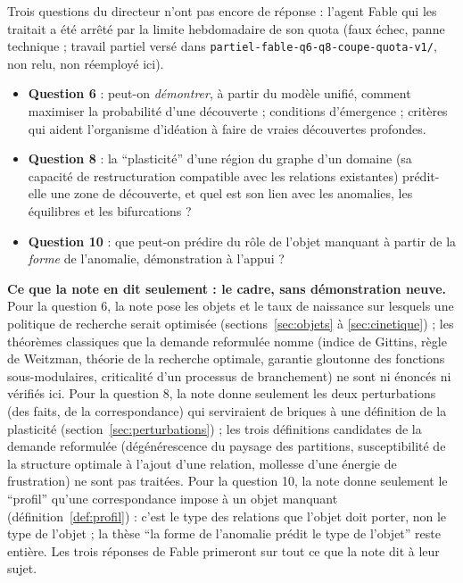 \documentclass[11pt,a4paper]{article}
\theoremstyle{definition}
\theoremstyle{plain}
\newcommand{\chemin}[1]{\nolinkurl{#1}}
\begin{document}
\begin{attente}
Trois questions du directeur n'ont pas encore de réponse : l'agent Fable qui les traitait a été
arrêté par la limite hebdomadaire de son quota (faux échec, panne technique ; travail partiel
versé dans \chemin{partiel-fable-q6-q8-coupe-quota-v1/}, non relu, non réemployé ici).
\begin{itemize}
\item \textbf{Question 6} : peut-on \emph{démontrer}, à partir du modèle unifié, comment maximiser la
probabilité d'une découverte ; conditions d'émergence ; critères qui aident l'organisme
d'idéation à faire de vraies découvertes profondes.
\item \textbf{Question 8} : la \enquote{plasticité} d'une région du graphe d'un domaine (sa capacité de
restructuration compatible avec les relations existantes) prédit-elle une zone de découverte,
et quel est son lien avec les anomalies, les équilibres et les bifurcations ?
\item \textbf{Question 10} : que peut-on prédire du rôle de l'objet manquant à partir de la
\emph{forme} de l'anomalie, démonstration à l'appui ?
\end{itemize}
\textbf{Ce que la note en dit seulement : le cadre, sans démonstration neuve.}
Pour la question 6, la note pose les objets et le taux de naissance sur lesquels une politique de
recherche serait optimisée (sections~\ref{sec:objets} à \ref{sec:cinetique}) ; les théorèmes
classiques que la demande reformulée nomme (indice de Gittins, règle de Weitzman, théorie de la
recherche optimale, garantie gloutonne des fonctions sous-modulaires, criticalité d'un processus
de branchement) ne sont ni énoncés ni vérifiés ici. Pour la question 8, la note donne seulement les
deux perturbations (des faits, de la correspondance) qui serviraient de briques à une définition de
la plasticité (section~\ref{sec:perturbations}) ; les trois définitions candidates de la demande
reformulée (dégénérescence du paysage des partitions, susceptibilité de la structure optimale à
l'ajout d'une relation, mollesse d'une énergie de frustration) ne sont pas traitées. Pour la
question 10, la note donne seulement le \enquote{profil} qu'une correspondance impose à un objet
manquant (définition~\ref{def:profil}) : c'est le type des relations que l'objet doit porter, non le
type de l'objet ; la thèse \enquote{la forme de l'anomalie prédit le type de l'objet} reste
entière. Les trois réponses de Fable primeront sur tout ce que la note dit à leur sujet.
\end{attente}
\end{document}
